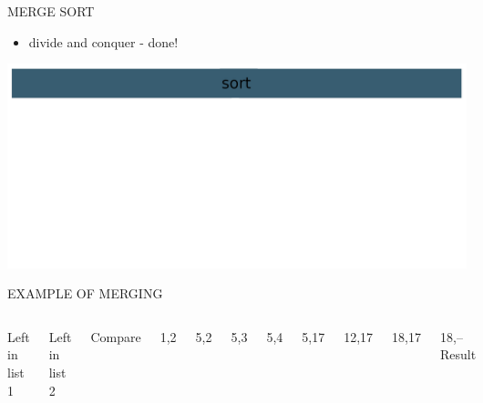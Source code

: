 \documentclass[aspectratio=169]{beamer}
\begin{document}
\begin{frame}{MERGE SORT}
\begin{itemize}
\item divide and conquer - done!
\end{itemize}
\begin{center}
\includegraphics[scale=0.70]{graphics/marge_sort5.png}
\end{center}
\end{frame}

\begin{frame}{EXAMPLE OF MERGING}
\begin{columns}
Left in list 1\par
[1,5,12,18,19,20]\par
[5,12,18,19,20]\par
[5,12,18,19,20]\par
[5,12,18,19,20]\par
[5,12,18,19,20]\par
[12,18,19,20]\par
[18,19,20]\par
[18,19,20]\par
[]
Left in list 2\par
[2,3,4,17]\par
[2,3,4,17]\par
[3,4,17]\par
[4,17]\par
[17]\par
[17]\par
[17]\par
[]\par
[]
Compare\par
1,2\par
5,2\par
5,3\par
5,4\par
5,17\par
12,17\par
18,17\par
18,--
Result\par
[]\par
[1]\par
[1,2]\par
[1,2,3]\par
[1,2,3,4]\par
[1,2,3,4,5]\par
[1,2,3,4,5,12]\par
[1,2,3,4,5,12,17]\par
[1,2,3,4,5,12,17,18,19,20]
\end{columns}
\end{frame}
\end{document}
